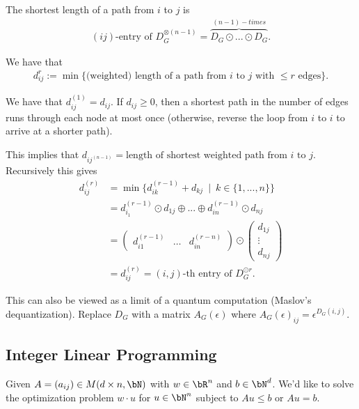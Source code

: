 \begin{prop}\label{prop:shortest-path-tropical}
  The shortest length of a path from $i$ to $j$ is 
  \begin{align*}
  \text{$(ij)$-entry of } D_G^{\otimes(n-1)} = \overbrace{D_G\odot ... \odot D_G}^{\text{$(n - 1)-times$}}.
  \end{align*}
\end{prop}
\begin{prf}
  We have that
  \begin{align*}
    d_{ij}^{r} := \min \{\text{(weighted) length of a path from $i$ to $j$ with $\leq r$ edges}\}.
  \end{align*}

  We have that $d_{ij}^{(1)} = d_{ij}$. If $d_{ij}\geq 0$, then a shortest path in the number of edges runs through each node at most once (otherwise, reverse the loop from $i$ to $i$ to arrive at a shorter path).

  This implies that $d_{ij^{(n-1)}} = \text{length of shortest weighted path from $i$ to $j$}$. Recursively this gives
  \begin{align*}
    d_{ij}^{(r)} &= \min\{d_{ik}^(r-1) + d_{kj} ~\mid~ k \in \{1,...,n\}\} \\
                 &= d_{i_1}^{(r-1)}\odot d_{1j}\oplus ... \oplus d_{in}^{(r-1)}\odot d_{nj} \\
                 &= \begin{pmatrix}	d_{i1}^{(r-1)}& \dots & d_{in}^{(r-n)} \end{pmatrix} \odot \begin{pmatrix}	d_{1j} \\ \vdots \\ d_{nj} \end{pmatrix} \\
                 &= d_{ij}^{(r)} = \text{$(i,j)$-th entry of $D^{\odot r}_G$}.
  \end{align*}
\end{prf}

This can also be viewed as a limit of a quantum computation (Maslov's dequantization). Replace $D_G$ with a matrix $A_G(\epsilon)$ where $A_G(\epsilon)_{ij} = \epsilon^{D_G(i,j)}$.

\subsection{Integer Linear Programming}
Given $A = (a_{ij}) \in M(d\times n, \bN)$ with $w \in \bR^n$ and $b \in \bN^d$. We'd like to solve the optimization problem $w \cdot u$ for $u \in \bN^n$ subject to $Au \leq b$ or $Au = b$.

